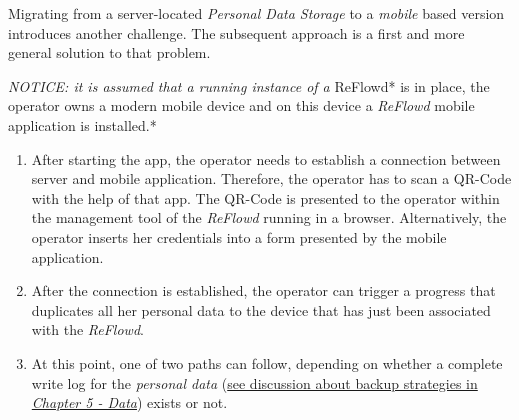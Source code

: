 \documentclass[12pt,english,a4paper,titlepage,cleardoublepage=empty,dottedtoc]{report}
\begin{document}
Migrating from a server-located \emph{Personal Data Storage} to a
\emph{mobile} based version introduces another challenge. The subsequent
approach is a first and more general solution to that problem.

\emph{NOTICE: it is assumed that a running instance of a }ReFlowd* is in
place, the operator owns a modern mobile device and on this device a
\emph{ReFlowd} mobile application is installed.*

\begin{enumerate}
\def\labelenumi{\arabic{enumi}.}
\item
  After starting the app, the operator needs to establish a connection
  between server and mobile application. Therefore, the operator has to
  scan a QR-Code with the help of that app. The QR-Code is presented to
  the operator within the management tool of the \emph{ReFlowd} running
  in a browser. Alternatively, the operator inserts her credentials into
  a form presented by the mobile application.
\item
  After the connection is established, the operator can trigger a
  progress that duplicates all her personal data to the device that has
  just been associated with the \emph{ReFlowd}.
\item
  At this point, one of two paths can follow, depending on whether a
  complete write log for the \emph{personal data}
  (\protect\hyperlink{data}{see discussion about backup strategies in
  \emph{Chapter 5 - Data}}) exists or not.


\end{enumerate}
\end{document}
